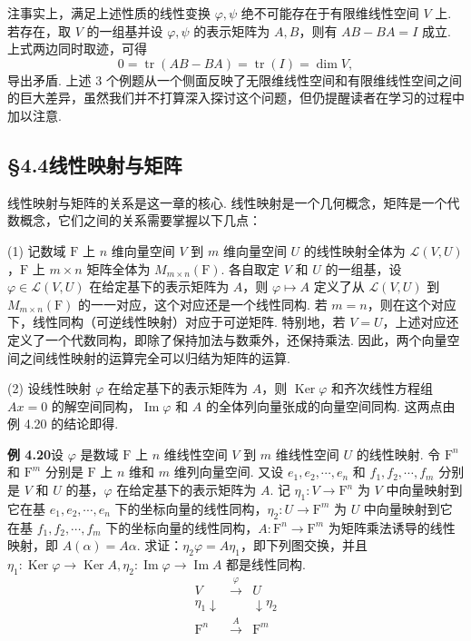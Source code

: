 \documentclass[UTF8, 12pt, fontset=fandol, oneside]{ctexart}
\begin{document}
注\quad 事实上，满足上述性质的线性变换 $\varphi,\psi$ 绝不可能存在于有限维线性空间 $V$ 上. 若存在，取 $V$ 的一组基并设 $\varphi,\psi$ 的表示矩阵为 $A,B$，则有 $AB-BA=I$ 成立. 上式两边同时取迹，可得
\[
0=\operatorname{tr}(AB-BA)=\operatorname{tr}(I)=\dim V,
\]
导出矛盾. 上述 3 个例题从一个侧面反映了无限维线性空间和有限维线性空间之间的巨大差异，虽然我们并不打算深入探讨这个问题，但仍提醒读者在学习的过程中加以注意.

\subsection*{§4.4\quad 线性映射与矩阵}

线性映射与矩阵的关系是这一章的核心. 线性映射是一个几何概念，矩阵是一个代数概念，它们之间的关系需要掌握以下几点：

(1) 记数域 $\mathrm{F}$ 上 $n$ 维向量空间 $V$ 到 $m$ 维向量空间 $U$ 的线性映射全体为 $\mathcal{L}(V,U)$，$\mathrm{F}$ 上 $m\times n$ 矩阵全体为 $M_{m\times n}(\mathrm{F})$. 各自取定 $V$ 和 $U$ 的一组基，设 $\varphi\in\mathcal{L}(V,U)$ 在给定基下的表示矩阵为 $A$，则 $\varphi\mapsto A$ 定义了从 $\mathcal{L}(V,U)$ 到 $M_{m\times n}(\mathrm{F})$ 的一一对应，这个对应还是一个线性同构. 若 $m=n$，则在这个对应下，线性同构（可逆线性映射）对应于可逆矩阵. 特别地，若 $V=U$，上述对应还定义了一个代数同构，即除了保持加法与数乘外，还保持乘法. 因此，两个向量空间之间线性映射的运算完全可以归结为矩阵的运算.

(2) 设线性映射 $\varphi$ 在给定基下的表示矩阵为 $A$，则 $\operatorname{Ker}\varphi$ 和齐次线性方程组 $Ax=0$ 的解空间同构，$\operatorname{Im}\varphi$ 和 $A$ 的全体列向量张成的向量空间同构. 这两点由例 4.20 的结论即得.

\noindent\textbf{例 4.20}\quad 设 $\varphi$ 是数域 $\mathrm{F}$ 上 $n$ 维线性空间 $V$ 到 $m$ 维线性空间 $U$ 的线性映射. 令 $\mathrm{F}^n$ 和 $\mathrm{F}^m$ 分别是 $\mathrm{F}$ 上 $n$ 维和 $m$ 维列向量空间. 又设 $e_1,e_2,\cdots,e_n$ 和 $f_1,f_2,\cdots,f_m$ 分别是 $V$ 和 $U$ 的基，$\varphi$ 在给定基下的表示矩阵为 $A$. 记 $\eta_1:V\to\mathrm{F}^n$ 为 $V$ 中向量映射到它在基 $e_1,e_2,\cdots,e_n$ 下的坐标向量的线性同构，$\eta_2:U\to\mathrm{F}^m$ 为 $U$ 中向量映射到它在基 $f_1,f_2,\cdots,f_m$ 下的坐标向量的线性同构，$A:\mathrm{F}^n\to\mathrm{F}^m$ 为矩阵乘法诱导的线性映射，即 $A(\alpha)=A\alpha$. 求证：$\eta_2\varphi=A\eta_1$，即下列图交换，并且 $\eta_1:\operatorname{Ker}\varphi\to\operatorname{Ker}A,\eta_2:\operatorname{Im}\varphi\to\operatorname{Im}A$ 都是线性同构.
\[
\begin{array}{ccc}
V & \xrightarrow{\varphi} & U\\
\eta_1\downarrow & & \downarrow\eta_2\\
\mathrm{F}^n & \xrightarrow{A} & \mathrm{F}^m
\end{array}
\]
\end{document}
